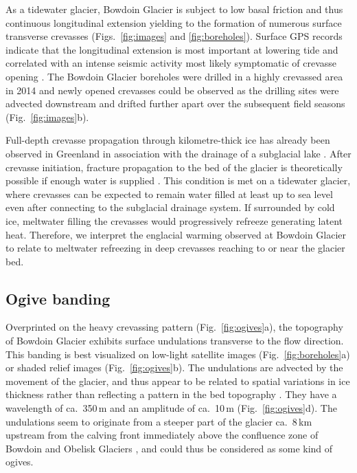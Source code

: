 \documentclass[utf8]{article}
\begin{document}
    As a tidewater glacier, Bowdoin Glacier is subject to low basal friction
    \citep{Seddik.etal.2019} and
    thus continuous longitudinal extension yielding to the formation of
    numerous surface transverse crevasses (Figs.~\ref{fig:images} and
    \ref{fig:boreholes}). Surface GPS records indicate that the longitudinal
    extension is most important at lowering tide and correlated with an intense
    seismic activity most likely symptomatic of crevasse opening
    \citep{Podolskiy.etal.2016, Podolskiy.etal.2017}.
    The Bowdoin Glacier boreholes were drilled in a highly crevassed area in
    2014 and newly opened crevasses could be observed as the drilling sites
    were
    advected downstream and drifted further apart over the subsequent field
    seasons (Fig.~\ref{fig:images}b).

    Full-depth crevasse propagation through kilometre-thick ice has already
    been observed in Greenland in association with the drainage of a subglacial
    lake \citep{Das.etal.2008}. After crevasse initiation, fracture propagation
    to the bed of the glacier is theoretically possible if enough water is
    supplied \citep{Veen.2007}. This condition is met on a tidewater glacier,
    where crevasses can be expected to remain water filled at least up to sea
    level even after connecting to the subglacial drainage system. If
    surrounded by cold ice, meltwater filling the crevasses would progressively
    refreeze generating latent heat. Therefore, we interpret the englacial
    warming observed at Bowdoin Glacier to relate to meltwater refreezing in
    deep crevasses reaching to or near the glacier bed.


\subsection{Ogive banding}

    Overprinted on the heavy crevassing pattern (Fig.~\ref{fig:ogives}a), the
    topography of Bowdoin Glacier exhibits surface undulations transverse to
    the flow direction. This banding is best visualized on low-light satellite
    images (Fig.~\ref{fig:boreholes}a) or shaded relief images
    (Fig.~\ref{fig:ogives}b). The undulations are advected by the movement of
    the glacier, and thus appear to be related to spatial variations in
    ice thickness rather than reflecting a pattern in the bed topography
    \citep[Fig.~\ref{fig:ogives}c;][Fig.~3]{Tsutaki.etal.2016}. They have a
    wavelength of ca.~350\,m and an amplitude of ca.~10\,m
    (Fig.~\ref{fig:ogives}d). The undulations seem to originate from a
    steeper part of the glacier ca.~8\,km upstream from the calving front
    immediately above the confluence zone of Bowdoin and Obelisk Glaciers
    \citep[Fig.~\ref{fig:images}a;][Fig.~3]{Tsutaki.etal.2016}, and
    could thus be considered as some kind of ogives.
\end{document}

